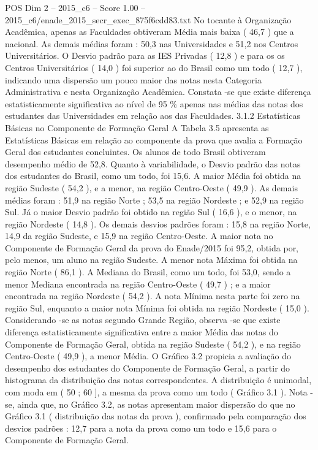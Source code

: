 \begin{textsample}{POS Dim 2 – 2015\_c6 – Score 1.00 – 2015\_c6/enade\_2015\_secr\_exec\_875f6cdd83.txt}
No tocante à Organização Acadêmica, apenas as Faculdades obtiveram Média mais baixa ( 46,7 ) que a nacional.
As demais médias foram : 50,3 nas Universidades e 51,2 nos Centros Universitários.
O Desvio padrão para as IES Privadas ( 12,8 ) e para os os Centros Universitários ( 14,0 ) foi superior ao do Brasil como um todo ( 12,7 ), indicando uma dispersão um pouco maior das notas nesta Categoria Administrativa e nesta Organização Acadêmica.
Constata -se que existe diferença estatisticamente significativa ao nível de 95 \% apenas nas médias das notas dos estudantes das Universidades em relação aos das Faculdades. 3.1.2 Estatísticas Básicas no Componente de Formação Geral A Tabela 3.5 apresenta as Estatísticas Básicas em relação ao componente da prova que avalia a Formação Geral dos estudantes concluintes.
Os alunos de todo Brasil obtiveram desempenho médio de 52,8.
Quanto à variabilidade, o Desvio padrão das notas dos estudantes do Brasil, como um todo, foi 15,6.
A maior Média foi obtida na região Sudeste ( 54,2 ), e a menor, na região Centro-Oeste ( 49,9 ).
As demais médias foram : 51,9 na região Norte ; 53,5 na região Nordeste ; e 52,9 na região Sul.
Já o maior Desvio padrão foi obtido na região Sul ( 16,6 ), e o menor, na região Nordeste ( 14,8 ).
Os demais desvios padrões foram : 15,8 na região Norte, 14,9 da região Sudeste, e 15,9 na região Centro-Oeste.
A maior nota no Componente de Formação Geral da prova do Enade/2015 foi 95,2, obtida por, pelo menos, um aluno na região Sudeste.
A menor nota Máxima foi obtida na região Norte ( 86,1 ).
A Mediana do Brasil, como um todo, foi 53,0, sendo a menor Mediana encontrada na região Centro-Oeste ( 49,7 ) ; e a maior encontrada na região Nordeste ( 54,2 ).
A nota Mínima nesta parte foi zero na região Sul, enquanto a maior nota Mínima foi obtida na região Nordeste ( 15,0 ).
Considerando -se as notas segundo Grande Região, observa -se que existe diferença estatisticamente significativa entre a maior Média das notas do Componente de Formação Geral, obtida na região Sudeste ( 54,2 ), e na região Centro-Oeste ( 49,9 ), a menor Média.
O Gráfico 3.2 propicia a avaliação do desempenho dos estudantes do Componente de Formação Geral, a partir do histograma da distribuição das notas correspondentes.
A distribuição é unimodal, com moda em ( 50 ; 60 ], a mesma da prova como um todo ( Gráfico 3.1 ).
Nota -se, ainda que, no Gráfico 3.2, as notas apresentam maior dispersão do que no Gráfico 3.1 ( distribuição das notas da prova ), confirmado pela comparação dos desvios padrões : 12,7 para a nota da prova como um todo e 15,6 para o Componente de Formação Geral.

\end{textsample}
